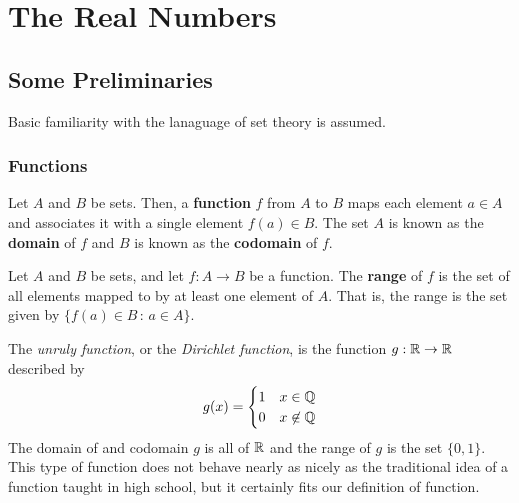 \chapter{The Real Numbers}
\section{Some Preliminaries}
Basic familiarity with the lanaguage of set theory is assumed.
\subsection*{Functions}
\begin{definition}
    Let $A$ and $B$ be sets. Then, a \textbf{function} $f$ from $A$ to $B$ maps each element $a\in A$ and associates it with a single element $f(a) \in B$. The set $A$ is known as the \textbf{domain} of $f$ and $B$ is known as the \textbf{codomain} of $f$. 
\end{definition}
\begin{definition}[Range]
    Let $A$ and $B$ be sets, and let $f: A\to B$ be a function. The \textbf{range} of $f$ is the set of all elements mapped to by at least one element of $A$. That is, the range is the set given by $\{ f(a)\in B \, : \, a\in A \}$.
\end{definition}
\begin{example}
    The \textit{unruly function}, or the \textit{Dirichlet function}, is the function $g: \mathbb{R} \to \mathbb{R}$ described by
    \[ g(x) = \begin{cases}
        1 & x\in\mathbb{Q} \\
        0 & x\not\in\mathbb{Q}
    \end{cases}\]
    The domain of and codomain $g$ is all of $\mathbb{R}$ and the range of $g$ is the set $\{0, 1\}$. This type of function does not behave nearly as nicely as the traditional idea of a function taught in high school, but it certainly fits our definition of function. 
\end{example}
